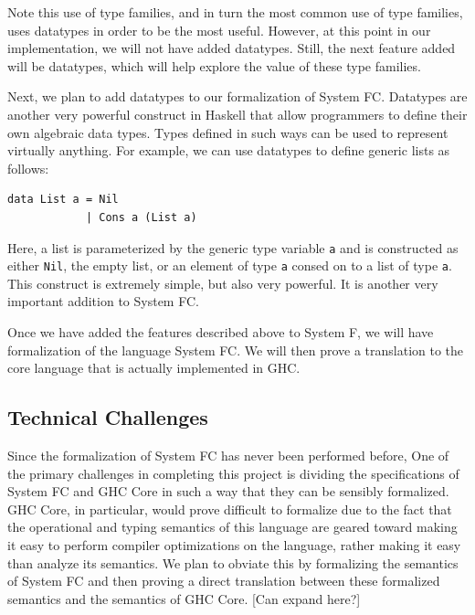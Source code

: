 \documentclass{sig-alternate}
\begin{document}
Note this use of type families, and in turn the most common use of type families, uses datatypes in order to be the most useful. However, at this point in our implementation, we will not have added datatypes. Still, the next feature added will be datatypes, which will help explore the value of these type families.

Next, we plan to add datatypes to our formalization of System FC.  Datatypes are another very powerful construct in Haskell that allow programmers to define their own algebraic data types.  Types defined in such ways can be used to represent virtually anything.  For example, we can use datatypes to define generic lists as follows:
\begin{verbatim}
data List a = Nil
            | Cons a (List a)
\end{verbatim}
Here, a list is parameterized by the generic type variable \texttt{a} and is constructed as either \texttt{Nil}, the empty list, or an element of type \texttt{a} consed on to a list of type \texttt{a}.  This construct is extremely simple, but also very powerful.  It is another very important addition to System FC.

Once we have added the features described above to System F, we will have formalization of the language System FC.  We will then prove a translation to the core language that is actually implemented in GHC.


\subsection{Technical Challenges}
\label{subsec:tech_challenges}
Since the formalization of System FC has never been performed before, 
One of the primary challenges in completing this project is dividing the specifications of System FC and GHC Core in such a way that they can be sensibly formalized. GHC Core, in particular, would prove difficult to formalize due to the fact that the operational and typing semantics of this language are geared toward making it easy to perform compiler optimizations on the language, rather making it easy than analyze its semantics. We plan to obviate this by formalizing the semantics of System FC and then proving a direct translation between these formalized semantics and the semantics of GHC Core. [Can expand here?]
\end{document}

